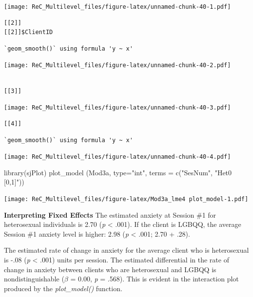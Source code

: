 \documentclass[
  11pt,
]{book}
\newenvironment{Shaded}{\begin{snugshade}}{\end{snugshade}}
\newcommand{\AttributeTok}[1]{\textcolor[rgb]{0.77,0.63,0.00}{#1}}
\newcommand{\FunctionTok}[1]{\textcolor[rgb]{0.00,0.00,0.00}{#1}}
\newcommand{\NormalTok}[1]{#1}
\newcommand{\StringTok}[1]{\textcolor[rgb]{0.31,0.60,0.02}{#1}}
\begin{document}
\texttt{[image: ReC\_Multilevel\_files/figure-latex/unnamed-chunk-40-1.pdf]}

\begin{verbatim}
[[2]]
[[2]]$ClientID
\end{verbatim}

\begin{verbatim}
`geom_smooth()` using formula 'y ~ x'
\end{verbatim}

\texttt{[image: ReC\_Multilevel\_files/figure-latex/unnamed-chunk-40-2.pdf]}

\begin{verbatim}

[[3]]
\end{verbatim}

\texttt{[image: ReC\_Multilevel\_files/figure-latex/unnamed-chunk-40-3.pdf]}

\begin{verbatim}
[[4]]
\end{verbatim}

\begin{verbatim}
`geom_smooth()` using formula 'y ~ x'
\end{verbatim}

\texttt{[image: ReC\_Multilevel\_files/figure-latex/unnamed-chunk-40-4.pdf]}

\begin{Shaded}
\begin{Highlighting}[]
\FunctionTok{library}\NormalTok{(sjPlot)}
\FunctionTok{plot\_model}\NormalTok{ (Mod3a, }\AttributeTok{type=}\StringTok{"int"}\NormalTok{, }\AttributeTok{terms =} \FunctionTok{c}\NormalTok{(}\StringTok{"SesNum"}\NormalTok{, }\StringTok{"Het0 [0,1]"}\NormalTok{))}
\end{Highlighting}
\end{Shaded}

\texttt{[image: ReC\_Multilevel\_files/figure-latex/Mod3a\_lme4 plot\_model-1.pdf]}

\textbf{Interpreting Fixed Effects}
The estimated anxiety at Session \#1 for heterosexual individuals is 2.70 (\emph{p} \textless{} .001). If the client is LGBQQ, the average Session \#1 anxiety level is higher: 2.98 (\emph{p} \textless{} .001; 2.70 + .28).

The estimated rate of change in anxiety for the average client who is heterosexual is -.08 (\emph{p} \textless{} .001) units per session. The estimated differential in the rate of change in anxiety between clients who are heterosexual and LGBQQ is nondistinguishable (\(\beta\) = 0.00, \emph{p} = .568). This is evident in the interaction plot produced by the \emph{plot\_model()} function.
\end{document}

